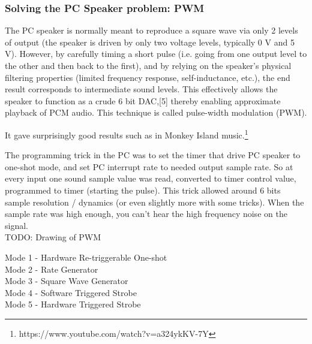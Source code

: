 \subsubsection{Solving the PC Speaker problem: PWM}

\par
 \begin{fancyquotes}
  The PC speaker is normally meant to reproduce a square wave via only 2 levels of output (the speaker is driven by only two voltage levels, typically 0 V and 5 V). However, by carefully timing a short pulse (i.e. going from one output level to the other and then back to the first), and by relying on the speaker's physical filtering properties (limited frequency response, self-inductance, etc.), the end result corresponds to intermediate sound levels. This effectively allows the speaker to function as a crude 6 bit DAC,[5] thereby enabling approximate playback of PCM audio. This technique is called pulse-width modulation (PWM).
 \end{fancyquotes}
\par
  It gave surprisingly good results such as in Monkey Island music.\footnote{https://www.youtube.com/watch?v=a324ykKV-7Y}

  \par
The programming trick in the PC was to set the timer that drive PC speaker to one-shot mode, and set PC interrupt rate to needed output sample rate. So at every input one sound sample value was read, converted to timer control value, programmed to timer (starting the pulse). This trick allowed around 6 bits sample resolution / dynamics (or even slightly more with some tricks). When the sample rate was high enough, you can’t hear the high frequency noise on the signal.\\
TODO: Drawing of PWM
\par
Mode 1 - Hardware Re-triggerable One-shot\\
Mode 2 - Rate Generator\\
Mode 3 - Square Wave Generator\\
Mode 4 - Software Triggered Strobe\\
Mode 5 - Hardware Triggered Strobe\\

